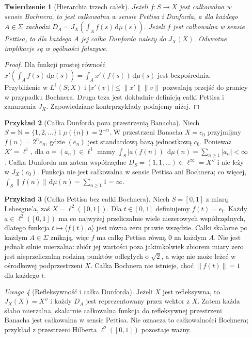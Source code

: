 \documentclass[11pt,a4paper]{article}
\numberwithin{equation}{section}
\theoremstyle{plain}
\newtheorem{twierdzenie}{Twierdzenie}[section]
\theoremstyle{definition}
\newtheorem{przyklad}[twierdzenie]{Przykład}
\theoremstyle{remark}
\newtheorem{uwaga}[twierdzenie]{Uwaga}
\newcommand{\N}{\mathbb N}
\begin{document}
\begin{twierdzenie}[Hierarchia trzech całek]
\label{thm:hierarchy-integrals15b}
Jeżeli $f:S\to X$ jest całkowalna w sensie Bochnera,
to jest całkowalna w sensie Pettisa i Dunforda, a dla
każdego $A\in\Sigma$ zachodzi
$D_A=J_X(\int_A f(s)\,\mathrm d\mu(s))$.
Jeżeli $f$ jest całkowalna w sensie Pettisa, to dla każdego
$A$ jej całka Dunforda należy do $J_X(X)$.
Odwrotne implikacje są w ogólności fałszywe.
\end{twierdzenie}
\begin{proof}
Dla funkcji prostej równość
$x'(\int_A f(s)\,\mathrm d\mu(s))=\int_Ax'(f(s))\,\mathrm d\mu(s)$
jest bezpośrednia. Przybliżenie w $L^1(S;X)$
i $|x'(v)|\le\|x'\|\|v\|$ pozwalają przejść do granicy
w przypadku Bochnera. Druga teza jest dokładnie definicją
całki Pettisa i zanurzenia $J_X$. Zapowiedziane
kontrprzykłady podajemy niżej.
\end{proof}

\begin{przyklad}[Całka Dunforda poza przestrzenią Banacha]
\label{ex:dunford-not-pettis15b}
Niech $S=\N=\{1,2,\ldots\}$ i
$\mu(\{n\})=2^{-n}$. W przestrzeni Banacha $X=c_0$
przyjmijmy $f(n)=2^ne_n$, gdzie $(e_n)$ jest standardową
bazą jednostkową $c_0$. Ponieważ $X'=\ell^1$, dla
$a=(a_n)\in\ell^1$ mamy
$\int_S|a(f(n))|\,\mathrm d\mu(n)
=\sum_{n\ge1}|a_n|<\infty$.
Całka Dunforda ma zatem współrzędne
$D_S=(1,1,\ldots)\in\ell^\infty=X''$ i nie leży w
$J_X(c_0)$. Funkcja nie jest całkowalna w sensie Pettisa
ani Bochnera; co więcej,
$\int_S\|f(n)\|\,\mathrm d\mu(n)=\sum_{n\ge1}1=\infty$.
\end{przyklad}

\begin{przyklad}[Całka Pettisa bez całki Bochnera]
\label{ex:pettis-not-bochner15b}
Niech $S=[0,1]$ z miarą Lebesgue'a, zaś
$X=\ell^2([0,1])$. Dla $t\in[0,1]$ definiujemy $f(t)=e_t$.
Każdy $a\in\ell^2([0,1])$ ma co najwyżej przeliczalnie
wiele niezerowych współrzędnych, dlatego funkcja
$t\mapsto\langle f(t),a\rangle$ jest równa zeru prawie
wszędzie. Całki skalarne po każdym $A\in\Sigma$ znikają,
więc $f$ ma całkę Pettisa równą $0$ na każdym $A$.
Nie jest jednak silnie mierzalna: zbiór jej wartości poza
jakimkolwiek zbiorem miary zero jest nieprzeliczalną rodziną
punktów odległych o $\sqrt 2$, a więc nie może leżeć
w ośrodkowej podprzestrzeni $X$. Całka Bochnera nie istnieje,
choć $\|f(t)\|=1$ dla każdego $t$.
\end{przyklad}

\begin{uwaga}[Refleksywność i całka Dunforda]
Jeżeli $X$ jest refleksywna, to $J_X(X)=X''$ i każdy
$D_A$ jest reprezentowany przez wektor z $X$. Zatem każda
słabo mierzalna, skalarnie całkowalna funkcja do refleksywnej
przestrzeni Banacha jest całkowalna w sensie Pettisa.
Nie oznacza to całkowalności Bochnera; przykład z
przestrzeni Hilberta $\ell^2([0,1])$ pozostaje ważny.
\end{uwaga}
\end{document}
